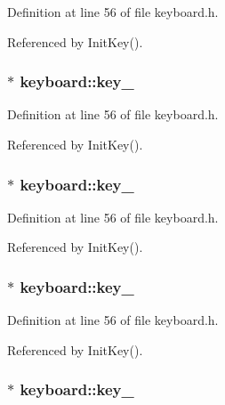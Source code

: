Definition at line 56 of file keyboard.h.

Referenced by Init\-Key().
\subsubsection{ $\ast$ {\bf keyboard::key\_}\hspace{0.3cm}{\tt  [private]}}\label{classkeyboard_keyboardr31}




Definition at line 56 of file keyboard.h.

Referenced by Init\-Key().
\subsubsection{ $\ast$ {\bf keyboard::key\_}\hspace{0.3cm}{\tt  [private]}}\label{classkeyboard_keyboardr32}




Definition at line 56 of file keyboard.h.

Referenced by Init\-Key().
\subsubsection{ $\ast$ {\bf keyboard::key\_}\hspace{0.3cm}{\tt  [private]}}\label{classkeyboard_keyboardr33}




Definition at line 56 of file keyboard.h.

Referenced by Init\-Key().
\subsubsection{ $\ast$ {\bf keyboard::key\_}\hspace{0.3cm}{\tt  [private]}}\label{classkeyboard_keyboardr34}




